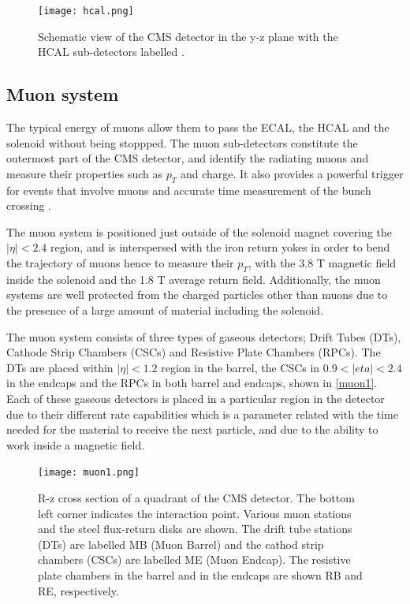 \begin{figure}[ht]
	\centering
	\texttt{[image: hcal.png]}
	\vspace{2mm}
	\caption[Schematic view of the CMS detector in the y-z plane with the HCAL sub-detectors labelled.]{Schematic view of the CMS detector in the y-z plane with the HCAL sub-detectors labelled \cite{CMS-PHO-GEN-2012-002}.}
	\label{hcal}
\end{figure}

\subsection{Muon system}

The typical energy of muons allow them to pass the ECAL, the HCAL and the solenoid without being stoppped. The muon sub-detectors constitute the outermost part of the CMS detector, and identify the radiating muons and measure their properties such as $p_T$ and charge. It also provides a powerful trigger for events that involve muons and accurate time measurement of the bunch crossing \cite{Layter:343814}.

The muon system is positioned just outside of the solenoid magnet covering the $|\eta| < 2.4$ region, and is interspersed with the iron return yokes in order to bend the trajectory of muons hence to measure their $p_T$, with the 3.8 T magnetic field inside the solenoid and the 1.8 T average return field. Additionally, the muon systems are well protected from the charged particles other than muons due to the presence of a large amount of material including the solenoid.

The  muon system consists of three types of gaseous detectors; Drift Tubes (DTs), Cathode Strip Chambers (CSCs) and Resistive Plate Chambers (RPCs). The DTs are placed within $|\eta| < 1.2$ region in the barrel, the CSCs in $0.9<|eta|<2.4$ in the endcaps and the RPCs in both barrel and endcaps, shown in \autoref{muon1}. Each of these gaseous detectors is placed in a particular region in the detector due to their different rate capabilities which is a parameter related with the time needed for the material to receive the next particle, and due to the ability to work inside a magnetic field.

\begin{figure}[ht]
	\centering
	\texttt{[image: muon1.png]}
	\vspace{2mm}
	\caption[R-z cross section of a quadrant of the CMS detector. The bottom left corner indicates the interaction point. Various muon stations and the steel flux-return disks are shown. The drift tube stations (DTs) are labelled MB (Muon Barrel) and the cathod strip chambers (CSCs) are labelled ME (Muon Endcap). The resistive plate chambers in the barrel and in the endcaps are shown RB and RE, respectively.]{R-z cross section of a quadrant of the CMS detector. The bottom left corner indicates the interaction point. Various muon stations and the steel flux-return disks are shown. The drift tube stations (DTs) are labelled MB (Muon Barrel) and the cathod strip chambers (CSCs) are labelled ME (Muon Endcap). The resistive plate chambers in the barrel and in the endcaps are shown RB and RE, respectively\cite{muon1}.}
	\label{muon1}
\end{figure}

